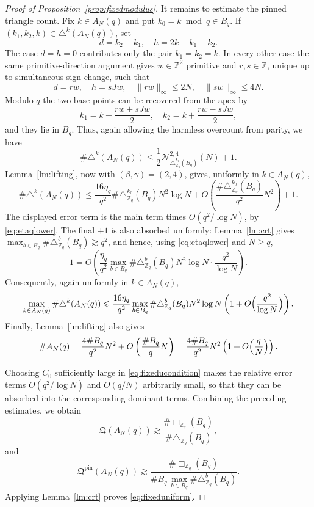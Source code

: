 \documentclass[11pt,reqno]{amsart}
\numberwithin{equation}{section}
\newcommand{\norm}[1]{\lVert #1\rVert_\infty}
\renewcommand{\le}{\leqslant}
\renewcommand{\ge}{\geqslant}
\begin{document}
\begin{proof}[Proof of Proposition~\ref{prop:fixedmodulus}]
It remains to estimate the pinned triangle count. Fix $k\in A_N(q)$ and put $k_0=k\bmod q\in B_q$. If $(k_1,k_2,k)\in\triangle^k(A_N(q))$, set
\[ d=k_2-k_1, \quad h=2k-k_1-k_2. \]
The case $d=h=0$ contributes only the pair $k_1=k_2=k$. In every other case the same primitive-direction argument gives $w\in\mathbb{Z}^2$ primitive and $r,s\in\mathbb{Z}$, unique up to simultaneous sign change, such that
\[ d=rw, \quad h=sJw, \quad \norm{rw}\le2N, \quad \norm{sw}\le4N. \]
Modulo $q$ the two base points can be recovered from the apex by
\[ k_1=k-\frac{rw+sJw}{2}, \quad k_2=k+\frac{rw-sJw}{2}, \]
and they lie in $B_q$. Thus, again allowing the harmless overcount from parity, we have
\[ \#\triangle^k(A_N(q)) \le \frac12\mathcal{N}_{\triangle^{k_0}_{\mathbb{Z}_q}(B_q)}^{2,4}(N)+1. \]
Lemma~\ref{lm:lifting}, now with $(\beta,\gamma)=(2,4)$, gives, uniformly in $k\in A_N(q)$,
\[ \#\triangle^k(A_N(q)) \le \frac{16\eta_q}{q^2}\#\triangle^{k_0}_{\mathbb{Z}_q}(B_q)N^2\log N + O\left(\frac{\#\triangle^{k_0}_{\mathbb{Z}_q}(B_q)}{q^2}N^2\right)+1. \]
The displayed error term is the main term times $O(q^2/\log N)$, by \eqref{eq:etaqlower}. The final $+1$ is also absorbed uniformly: Lemma~\ref{lm:crt} gives $\max_{b\in B_q}\#\triangle^b_{\mathbb{Z}_q}(B_q)\gtrsim q^2$, and hence, using \eqref{eq:etaqlower} and $N\ge q$,
\[ 1=O\left(\frac{\eta_q}{q^2}\max_{b\in B_q}\#\triangle^b_{\mathbb{Z}_q}(B_q)N^2\log N\cdot\frac{q^2}{\log N}\right). \]
Consequently, again uniformly in $k\in A_N(q)$,
\begin{equation}\label{eq:pinnedasymp}
\max_{k\in A_N(q)}\#\triangle^k(A_N(q)) \le \frac{16\eta_q}{q^2}\max_{b\in B_q}\#\triangle^b_{\mathbb{Z}_q}(B_q)N^2\log N \left(1+O\Bigl(\frac{q^2}{\log N}\Bigr)\right).
\end{equation}
Finally, Lemma~\ref{lm:lifting} also gives
\begin{equation}\label{eq:sizeANupper}
\#A_N(q) = \frac{4\#B_q}{q^2}N^2+O\left(\frac{\#B_q}{q}N\right)
= \frac{4\#B_q}{q^2}N^2\left(1+O\Bigl(\frac{q}{N}\Bigr)\right).
\end{equation}

Choosing $C_0$ sufficiently large in \eqref{eq:fixeducondition} makes the relative error terms $O(q^2/\log N)$ and $O(q/N)$ arbitrarily small, so that they can be absorbed into the corresponding dominant terms.
Combining the preceding estimates, we obtain
\[ \mathfrak{Q}(A_N(q)) \gtrsim \frac{\#\Box_{\mathbb{Z}_q}(B_q)}{\#\triangle_{\mathbb{Z}_q}(B_q)}, \]
and
\[ \mathfrak{Q}^{\mathrm{pin}}(A_N(q)) \gtrsim \frac{\#\Box_{\mathbb{Z}_q}(B_q)}{\#B_q\,\max_{b\in B_q}\#\triangle^b_{\mathbb{Z}_q}(B_q)}. \]
Applying Lemma~\ref{lm:crt} proves \eqref{eq:fixeduniform}.
\end{proof}
\end{document}

